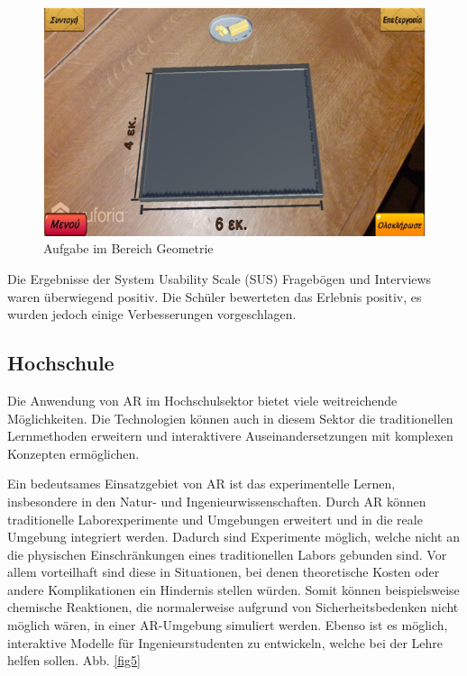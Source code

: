 \documentclass[conference]{IEEEtran}
\begin{document}
\begin{figure}[htbp]
    \centerline{\includegraphics[scale=0.7]{img/geometrie.png}}
    \caption{Aufgabe im Bereich Geometrie \cite{b8}}
    \label{fig4}
\end{figure}

Die Ergebnisse der System Usability Scale (SUS) Fragebögen und Interviews waren überwiegend positiv. Die Schüler bewerteten das Erlebnis positiv, es wurden jedoch einige Verbesserungen vorgeschlagen. \cite{b8}

\subsection{Hochschule}
Die Anwendung von AR im Hochschulsektor bietet viele weitreichende Möglichkeiten. Die Technologien können auch in diesem Sektor die traditionellen
Lernmethoden erweitern und interaktivere Auseinandersetzungen mit komplexen Konzepten ermöglichen.

Ein bedeutsames Einsatzgebiet von AR ist das experimentelle Lernen, insbesondere in den Natur- und Ingenieurwissenschaften.
Durch AR können traditionelle Laborexperimente und Umgebungen erweitert und in die reale Umgebung integriert werden. Dadurch sind Experimente möglich,
welche nicht an die physischen Einschränkungen eines traditionellen Labors gebunden sind. Vor allem vorteilhaft sind diese in Situationen, bei denen
theoretische Kosten oder andere Komplikationen ein Hindernis stellen würden.\cite{b9} Somit können beispielsweise chemische Reaktionen, die normalerweise
aufgrund von Sicherheitsbedenken nicht möglich wären, in einer AR-Umgebung simuliert werden. Ebenso ist es möglich, interaktive Modelle für Ingenieurstudenten zu entwickeln, welche bei der Lehre helfen sollen. Abb. \ref{fig5}
\end{document}
